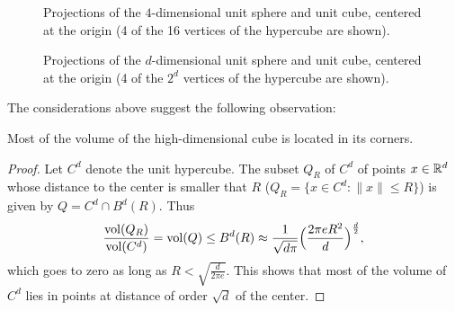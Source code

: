 \begin{figure}[ht!]
  \centering
  \caption{Projections of the $4$-dimensional unit sphere and unit cube, centered at the origin (4 of the 16 vertices of the hypercube are shown).}
  \label{4dim}
\end{figure}

\begin{figure}[ht!]
  \centering
  \caption{Projections of the $d$-dimensional unit sphere and unit cube, centered at the origin (4 of the $2^d$ vertices of the hypercube are shown).}
  \label{ddim}
\end{figure}

The considerations above suggest the following observation:




\begin{fact}\label{fact:hypercubemostlycorners}
Most of the volume of the high-dimensional cube is located in its corners.
\end{fact}


\begin{proof}
Let $C^d$ denote the unit hypercube. The subset $Q_R$ of $C^d$ of points $x\in\mathbb{R}^d$ whose distance to the center is smaller that $R$ ($Q_R = \{x\in C^d: \|x\|\leq R\}$) is given by $Q = C^d\cap B^d(R)$. Thus
\[
\frac{\operatorname{vol}(Q_R)}{\operatorname{vol}(C^d)} = \operatorname{vol}(Q) \le B^d(R) \approx \frac{1}{\sqrt{d\pi}} \Big( \frac{2\pi e R^2}{d} \Big)^{\frac{d}{2}},
\]
which goes to zero as long as $R<\sqrt{\frac{d}{2\pi e}}$. This shows that most of the volume of $C^d$ lies in points at distance of order $\sqrt{d}$ of the center.

\end{proof}




